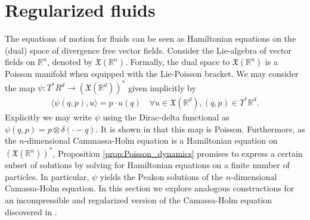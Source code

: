 \documentclass[12pt]{amsart}
\begin{document}
\section{Regularized fluids}
  The equations of motion for fluids can be seen as
  Hamiltonian equations on the (dual) space of divergence
  free vector fields.
  Consider the Lie-algebra of vector fields on $\mathbb{R}^n$, 
  denoted by $\mathfrak{X}(\mathbb{R}^n)$.
  Formally, the dual space to $\mathfrak{X}(\mathbb{R}^n)$ is a Poisson
  manifold when equipped with the Lie-Poisson bracket.
  We may consider the map
  $\psi: T^*R^d \to ( \mathfrak{X}(\mathbb{R}^d))^*$
  given implicitly by
  \begin{align*}
    \langle \psi(q,p) , u \rangle = p \cdot u(q) \quad
    \forall u \in \mathfrak{X}(\mathbb{R}^d), (q,p) \in T^*\mathbb{R}^d.
  \end{align*}
  Explicitly we may write $\psi$ using the Dirac-delta
  functional as $\psi(q,p) = p \otimes \delta( \cdot - q)$.
  It is shown in \cite{HolmMarsden2005} that this map is Poisson.
  Furthermore, as the $n$-dimensional Cammassa-Holm equation is a
  Hamiltonian equation on $(\mathfrak{X}(\mathbb{R}^n))^*$,
  Proposition \ref{prop:Poisson_dynamics} promises to express a 
  certain subset
  of solutions by solving for Hamiltonian equations on a finite number
  of particles.
  In particular, $\psi$ yields the Peakon solutions of the $n$-dimensional
  Camassa-Holm equation.
  In this section we explore analogous constructions for
  an incompressible and regularized version of the
  Camassa-Holm equation discovered in \cite{MumfordMichor2013}.
\end{document}
